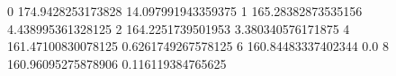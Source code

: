 0 174.9428253173828 14.097991943359375
1 165.28382873535156 4.438995361328125
2 164.2251739501953 3.380340576171875
4 161.47100830078125 0.6261749267578125
6 160.84483337402344 0.0
8 160.96095275878906 0.116119384765625
